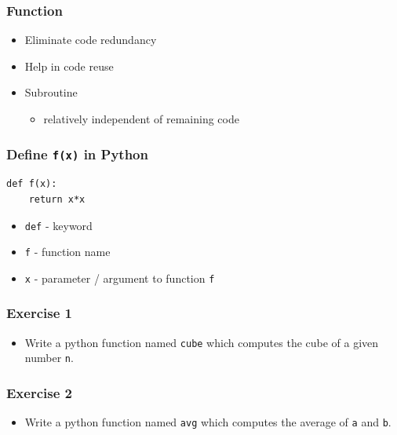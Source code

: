 \documentclass[17pt]{beamer}
\begin{document}
\begin{frame}
\frametitle{Function}
\label{sec-4}
\begin{itemize}
\item Eliminate code redundancy\pause
\item Help in code reuse\pause
\item Subroutine
	\begin{itemize}
	\item relatively independent of remaining code
	\end{itemize}
\end{itemize}
\end{frame}
\begin{frame}[fragile]
\frametitle{Define \texttt{f(x)} in Python}
\label{sec-5}

\lstset{language=Python}
\begin{lstlisting}
def f(x):
    return x*x
\end{lstlisting}

\begin{itemize}\pause
\item \texttt{def} - keyword\pause
\item \texttt{f} - function name\pause
\item \texttt{x} - parameter / argument to function \texttt{f}
\end{itemize}
\end{frame}
\begin{frame}
\frametitle{Exercise 1}
\label{sec-6}

\begin{itemize}
\item Write a python function named \texttt{cube} which computes the cube of a given
  number \texttt{n}.
\end{itemize}
\end{frame}
\begin{frame}
\frametitle{Exercise 2}
\label{sec-7}

\begin{itemize}
\item Write a python function named \texttt{avg} which computes the average of
  \texttt{a} and \texttt{b}.
\end{itemize}
\end{frame}
\end{document}
